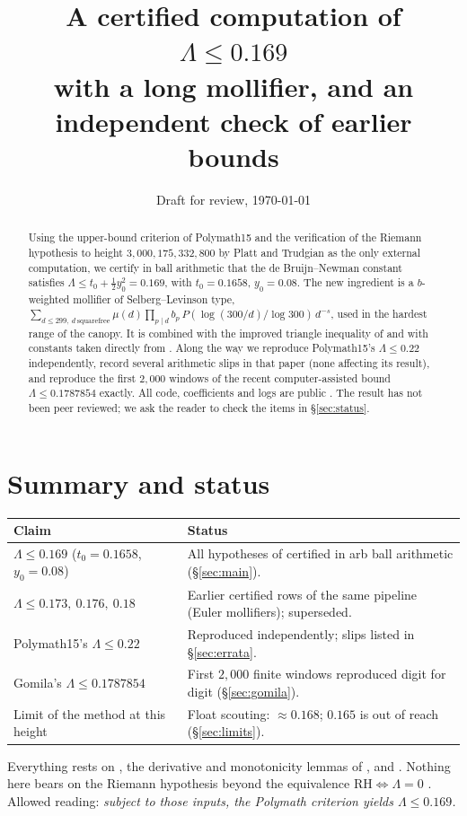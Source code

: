 \documentclass[11pt]{amsart}
\title[A certified computation of $\Lambda\le0.169$]{A certified computation of $\Lambda\le 0.169$\\ with a long mollifier, and an independent check of earlier bounds}
\author{\authorname}
\date{Draft for review, \today}
\begin{document}
\begin{abstract}
Using the upper-bound criterion of Polymath15 \cite{pm15} and the verification of the Riemann hypothesis to height
$3{,}000{,}175{,}332{,}800$ by Platt and Trudgian \cite{pt} as the only external computation, we certify in ball
arithmetic that the de Bruijn--Newman constant satisfies $\Lambda\le t_0+\tfrac12y_0^2=0.169$, with $t_0=0.1658$,
$y_0=0.08$. The new ingredient is a $b$-weighted mollifier of Selberg--Levinson type,
$\sum_{d\le 299,\ d\ \text{squarefree}}\mu(d)\prod_{p\mid d}b_p\,P(\log(300/d)/\log 300)\,d^{-s}$, used in the
hardest range of the canopy. It is combined with the improved triangle inequality of \cite{pm15} and with constants
taken directly from \cite[Thm.~1.3]{pm15}. Along the way we reproduce Polymath15's $\Lambda\le0.22$ independently,
record several arithmetic slips in that paper (none affecting its result), and reproduce the first $2{,}000$ windows of
the recent computer-assisted bound $\Lambda\le0.1787854$ \cite{gomila} exactly. All code, coefficients and logs are
public \cite{repo}. The result has not been peer reviewed; we ask the reader to check the items in \S\ref{sec:status}.
\end{abstract}
\maketitle

\section{Summary and status}\label{sec:status}
\begin{center}
\begin{tabular}{p{6.4cm}p{8.4cm}}
\toprule
Claim & Status \\ \midrule
$\Lambda\le0.169$ ($t_0=0.1658$, $y_0=0.08$) & All hypotheses of \cite[Thm.~1.2]{pm15} certified in arb ball arithmetic (\S\ref{sec:main}). \\
$\Lambda\le0.173,\ 0.176,\ 0.18$ & Earlier certified rows of the same pipeline (Euler mollifiers); superseded. \\
Polymath15's $\Lambda\le0.22$ & Reproduced independently; slips listed in \S\ref{sec:errata}. \\
Gomila's $\Lambda\le0.1787854$ \cite{gomila} & First $2{,}000$ finite windows reproduced digit for digit (\S\ref{sec:gomila}). \\
Limit of the method at this height & Float scouting: $\approx0.168$; $0.165$ is out of reach (\S\ref{sec:limits}). \\
\bottomrule
\end{tabular}
\end{center}
\noindent Everything rests on \cite[Thms.~1.2, 1.3]{pm15}, the derivative and monotonicity lemmas of \cite[\S8]{pm15},
and \cite{pt}. Nothing here bears on the Riemann hypothesis beyond the equivalence $\mathrm{RH}\iff\Lambda=0$ \cite{rt}.
Allowed reading: \emph{subject to those inputs, the Polymath criterion yields $\Lambda\le0.169$.}
\end{document}
